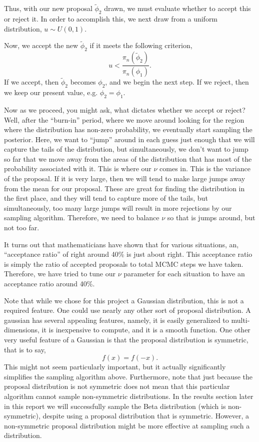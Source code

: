 \documentclass{article}
\begin{document}
Thus, with our new proposal $\tilde \phi_2$ drawn, we must evaluate
whether to accept this or reject it. In order to accomplish this, we
next draw from a uniform distribution, $u \sim U(0,1)$. 

Now, we accept the new $\tilde \phi_2$ if it meets the following
criterion, 
\begin{equation}
u < \frac{\pi_n(\tilde \phi_2)}{\pi_n(\phi_1)}. 
\end{equation}
If we accept, then $\tilde \phi_2$ becomes $\phi_2$, and we begin the
next step. If we reject, then we keep our present value, e.g. $\phi_2 = \phi_1$. 

Now as we proceed, you might ask, what dictates whether we accept or
reject? Well, after the ``burn-in'' period, where we move around looking
for the region where the distribution has non-zero probability, we
eventually start sampling the posterior. Here, we want to ``jump''
around in each guess just enough that we will capture the tails of the
distribution, but simultaneously, we don't want to jump so far that we
move away from the areas of the distribution that has most of the
probability associated with it. This is where our $\nu$ comes in. This
is the variance of the proposal. If it is very large, then we will tend
to make large jumps away from the mean for our proposal. These are great
for finding the distribution in the first place, and they will tend to
capture more of the tails, but simultaneously, too many large jumps will
result in more rejections by our sampling algorithm. Therefore, we need
to balance $\nu$ so that is jumps around, but not too far.

It turns out that mathematicians have shown that for various situations,
an, ``acceptance ratio'' of right around 40\% is just about right. This
acceptance ratio is simply the ratio of accepted proposals to total MCMC
steps we have taken. Therefore, we have tried to tune our $\nu$
parameter for each situation to have an acceptance ratio around 40\%. 

Note that while we chose for this project a Gaussian distribution, this is not
a required feature. One could use nearly any other sort of proposal distribution. A gaussian
has several appealing features, namely, it is easily generalized to multi-dimensions, it is inexpensive to 
compute, and it is a smooth function.  One other very useful feature of a Gaussian is that the 
proposal distribution is symmetric, that is to say,
\begin{equation}
  f(x) = f(-x). 
\end{equation}
This might not seem particularly important, but it actually significantly simplifies the sampling algorithm above. 
Furthermore, note that just because the proposal distribution is not symmetric does not mean that this particular 
algorithm cannot sample non-symmetric distributions. In the results section later in this report 
we will successfully sample the Beta distribution (which is non-symmetric), despite using a proposal distribution
that is symmetric. However, a non-symmetric proposal distribution might be more effective at sampling such a 
distribution. 
\end{document}
